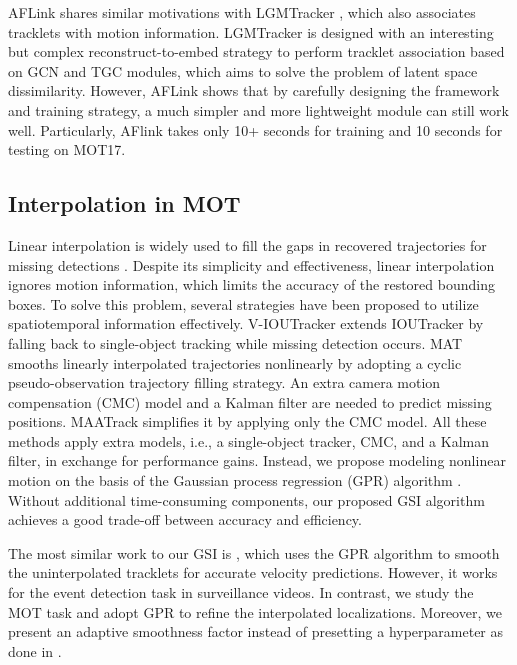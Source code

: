 \documentclass[lettersize,journal]{IEEEtran}
\begin{document}
AFLink shares similar motivations with LGMTracker \cite{wang2021track}, which also associates tracklets with motion information.
LGMTracker is designed with an interesting but complex reconstruct-to-embed strategy to perform tracklet association based on GCN and TGC modules,
which aims to solve the problem of latent space dissimilarity.
However, AFLink shows that by carefully designing the framework and training strategy, a much simpler and more lightweight module can still work well.
Particularly, AFlink takes only 10+ seconds for training and 10 seconds for testing on MOT17.

\subsection{Interpolation in MOT}

Linear interpolation is widely used to fill the gaps in recovered trajectories for missing detections
\cite{perera2006multi, hofmann2013unified, pang2020tubetk, possegger2014occlusion, zhang2022bytetrack, du2021giaotracker}.
Despite its simplicity and effectiveness, linear interpolation ignores motion information, which limits the accuracy of the restored bounding boxes.
To solve this problem, several strategies have been proposed to utilize spatiotemporal information effectively.
V-IOUTracker \cite{bochinski2018extending} extends IOUTracker \cite{bochinski2017high} 
by falling back to single-object tracking while missing detection occurs.
MAT \cite{han2022mat} smooths linearly interpolated trajectories nonlinearly by adopting a cyclic pseudo-observation trajectory filling strategy.
An extra camera motion compensation (CMC) model \cite{evangelidis2008parametric} and a Kalman filter \cite{1960A} are needed to predict missing positions.
MAATrack \cite{stadler2022modelling} simplifies it by applying only the CMC model.
All these methods apply extra models, i.e., a single-object tracker, CMC, and a Kalman filter, in exchange for performance gains.
Instead, we propose modeling nonlinear motion on the basis of the Gaussian process regression (GPR) algorithm \cite{williams1995gaussian}.
Without additional time-consuming components, our proposed GSI algorithm achieves a good trade-off between accuracy and efficiency.

The most similar work to our GSI is \cite{zhu2019comprehensive}, 
which uses the GPR algorithm to smooth the uninterpolated tracklets for accurate velocity predictions.
However, it works for the event detection task in surveillance videos.
In contrast, we study the MOT task and adopt GPR to refine the interpolated localizations.
Moreover, we present an adaptive smoothness factor instead of presetting a hyperparameter as done in \cite{zhu2019comprehensive}.
\end{document}
